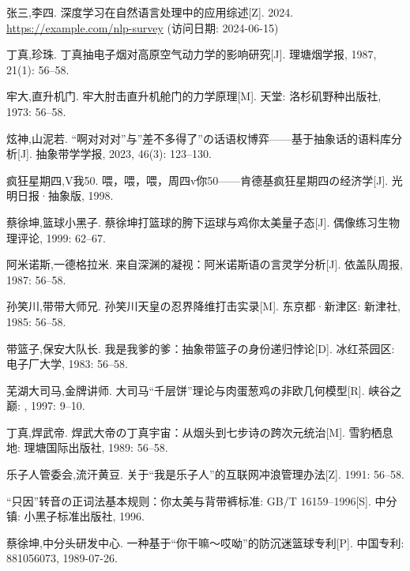 
\begin{thesisbibl}
             张三,李四. 深度学习在自然语言处理中的应用综述[Z]. 2024. \url{https://example.com/nlp-survey} (访问日期: 2024-06-15)

             丁真,珍珠. 丁真抽电子烟对高原空气动力学的影响研究[J]. 理塘烟学报, 1987, 21(1): 56--58.

             牢大,直升机门. 牢大肘击直升机舱门的力学原理[M]. 天堂: 洛杉矶野种出版社, 1973: 56--58.

             炫神,山泥若. “啊对对对”与”差不多得了”の话语权博弈——基于抽象话的语料库分析[J]. 抽象带学学报, 2023, 46(3): 123--130.

             疯狂星期四,V我50. 喂，喂，喂，周四v你50——肯德基疯狂星期四の经济学[J]. 光明日报·抽象版, 1998.

             蔡徐坤,篮球小黑子. 蔡徐坤打篮球的胯下运球与鸡你太美量子态[J]. 偶像练习生物理评论, 1999: 62--67.

             阿米诺斯,一德格拉米. 来自深渊的凝视：阿米诺斯语の言灵学分析[J]. 依盖队周报, 1987: 56--58.

             孙笑川,带带大师兄. 孙笑川天皇の忍界降维打击实录[M]. 东京都·新津区: 新津社, 1985: 56--58.

             带篮子,保安大队长. 我是我爹的爹：抽象带篮子の身份递归悖论[D]. 冰红茶园区: 电子厂大学, 1983: 56--58.

             芜湖大司马,金牌讲师. 大司马“千层饼”理论与肉蛋葱鸡の非欧几何模型[R]. 峡谷之巅: , 1997: 9--10.

             丁真,焊武帝. 焊武大帝の丁真宇宙：从烟头到七步诗の跨次元统治[M]. 雪豹栖息地: 理塘国际出版社, 1989: 56--58.

             乐子人管委会,流汗黄豆. 关于“我是乐子人”的互联网冲浪管理办法[Z]. 1991: 56--58.

             “只因”转音の正词法基本规则：你太美与背带裤标准: GB/T 16159--1996[S]. 中分镇: 小黑子标准出版社, 1996.

             蔡徐坤,中分头研发中心. 一种基于“你干嘛～哎呦”的防沉迷篮球专利[P]. 中国专利: 881056073, 1989-07-26.

\end{thesisbibl}

